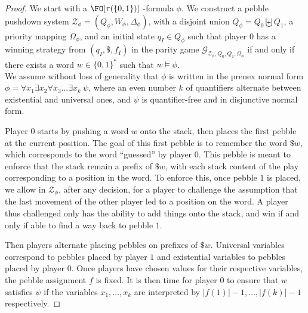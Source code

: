 \documentclass[a4paper,UKenglish,cleveref, autoref, thm-restate]{lipics-v2021}
\begin{document}
\begin{proof}

\noindent
We start with
 a 
 $\FO[\tau(\{0,1\})]$%
-formula $\phi$.
%
%
We construct
a pebble pushdown system $\mathcal{Z}_\phi = (Q_\phi,W_\phi, \Delta_\phi )$, with a disjoint
union $Q_\phi = Q_0  \biguplus Q_1 $, a priority mapping $\Omega_\phi$, and an initial state $q_I \in Q_\phi$
such that
player $0$ has a winning strategy from $(q_I, \$, f_I)$ in the  parity game
$\mathcal{G}_{\mathcal{Z_\phi}, Q_0,Q_1, \Omega_\phi}$
if and only if
there exists a word $w \in \{0,1\}^*$ such that
$w  \models \phi $. \\

\noindent
We assume without loss of generality that $\phi$ is written in the prenex normal form
$\phi = \forall x_1 \exists x_2 \forall x_3 \ldots \exists x_k ~ \psi$, where 
an even number $k$ of quantifiers alternate between existential and universal ones, and 
$\psi$ is quantifier-free and in disjunctive normal form.






Player $0$ starts by pushing a word $w$ onto the stack, then places the first pebble at the current position. The goal of this first pebble is to remember the word $\$w$, which corresponds to the 
word “guessed” by player $0$. This pebble is meant to enforce that the stack remain a prefix of $\$w$, with each stack content of the play corresponding to a position in the word. To enforce this, once pebble $1$ is placed, we allow in $\mathcal{Z}_\phi$, after any decision, for a player to challenge the assumption that the last movement of the other player led to a position on the word. A player thus challenged only has the ability to add things onto the stack, and win if and only if able to find a way back to pebble $1$. 

Then players alternate placing pebbles on prefixes of $\$w$. Universal variables correspond to pebbles placed by player $1$ and existential variables to pebbles placed by player $0$. 
Once players have chosen values for their respective variables, the pebble assignment $f$ is fixed. It is then time
for player $0$ to ensure that
$w$ satisfies $\psi$ if the variables $x_1, \ldots, x_k$ are interpreted by 
$ |f(1)|-1, \ldots, |f(k)|-1$ respectively.




\end{proof}
\end{document}
